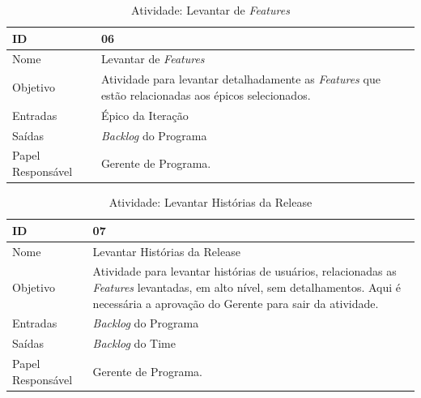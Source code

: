   \begin{table}[H]
    \centering
      \begin{tabular}{| m{5em} | m{10cm} |}
        \hline
        ID       & 06   \\ \hline
        Nome     & Levantar de \textit{Features}    \\ \hline
        Objetivo & Atividade para levantar detalhadamente as \textit{Features}  que estão relacionadas aos épicos selecionados. \\ \hline
        Entradas & Épico da Iteração\\ \hline
        Saídas   & \textit{Backlog} do Programa \\ \hline
        Papel Responsável   & Gerente de Programa. \\ \hline
      \end{tabular}
      \caption{Atividade: Levantar de \textit{Features} }
      \label{tabela:atividade6}
  \end{table}

  \begin{table}[H]
    \centering
      \begin{tabular}{| m{5em} | m{10cm} |}
        \hline
        ID       & 07   \\ \hline
        Nome     & Levantar Histórias da Release  \\ \hline
        Objetivo & Atividade para levantar histórias de usuários, relacionadas as \textit{Features}  levantadas, em alto nível, sem detalhamentos. Aqui é necessária a aprovação do Gerente para sair da atividade.  \\ \hline
        Entradas & \textit{Backlog} do Programa\\ \hline
        Saídas   & \textit{Backlog} do Time \\ \hline
        Papel Responsável   & Gerente de Programa. \\ \hline
      \end{tabular}
      \caption{Atividade: Levantar Histórias da Release}
      \label{tabela:atividade7}
  \end{table}

